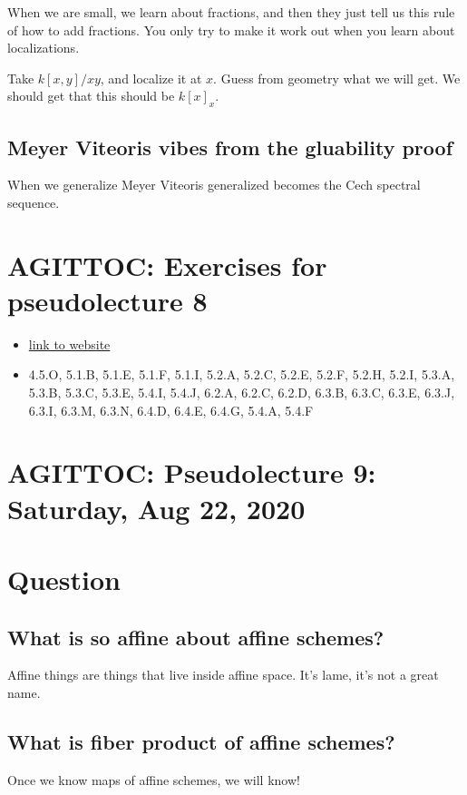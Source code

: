 \documentclass{book}
\theoremstyle{definition}
\begin{document}
When we are small, we learn about fractions, and then they just tell us this
rule of how to add fractions. You only try to make it work out when you
learn about localizations.


Take $k[x, y]/xy$, and localize it at $x$. Guess from geometry what we will get.
We should get that this should be $k[x]_x$.

\subsection{Meyer Viteoris vibes from the gluability proof}

When we generalize Meyer Viteoris generalized becomes the Cech spectral
sequence.

\section{AGITTOC: Exercises for pseudolecture 8}

\begin{itemize}
\item \href{https://math216.wordpress.com/2017-18-course/#lob}{link to website}
\item 4.5.O, 5.1.B, 5.1.E, 5.1.F, 5.1.I, 5.2.A, 5.2.C, 5.2.E, 5.2.F, 5.2.H, 5.2.I, 5.3.A, 5.3.B, 5.3.C, 5.3.E, 5.4.I, 5.4.J, 6.2.A, 6.2.C, 6.2.D, 6.3.B, 6.3.C, 6.3.E, 6.3.J, 6.3.I, 6.3.M, 6.3.N, 6.4.D, 6.4.E, 6.4.G, 5.4.A, 5.4.F
\end{itemize}

\section{AGITTOC: Pseudolecture 9: Saturday, Aug 22, 2020}

\section{Question}

\subsection{What is so affine about affine schemes?}
Affine things are things that live inside affine space. It's lame, it's not a
great name. 

\subsection{What is fiber product of affine schemes?}
Once we know maps of affine schemes, we will know!
\end{document}
